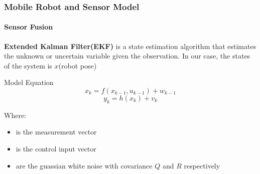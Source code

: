 \begin{frame}
	\frametitle{Mobile Robot and Sensor Model}
	\framesubtitle{Sensor Fusion}
	\textbf{Extended Kalman Filter(EKF)} is a state estimation algorithm that estimates the unknown or uncertain variable given the observation. In our case, the states of the system is \(x\)(robot pose)
	\begin{block}{Model Equation}
	\begin{equation}
		x_k = f(x_{k-1},u_{k-1}) + w_{k-1}
	\end{equation}
	\begin{equation}
		y_k = h(x_k) + v_k
	\end{equation}
	\end{block}
	Where:
	\begin{itemize}
		\item { is the measurement vector}
		\item { is the control input vector}
		\item { are the guassian white noise with covariance \(Q\) and \(R\)} respectively
	\end{itemize}
\end{frame}


